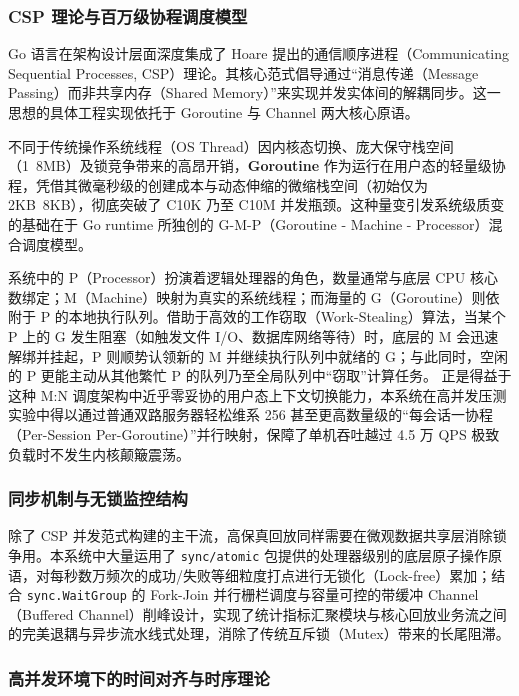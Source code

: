 \subsubsection{CSP 理论与百万级协程调度模型}

Go 语言在架构设计层面深度集成了 Hoare\cite{CSP} 提出的通信顺序进程（Communicating Sequential Processes, CSP）理论。其核心范式倡导通过“消息传递（Message Passing）而非共享内存（Shared Memory）”来实现并发实体间的解耦同步\cite{GoConcurrencyPatterns}。这一思想的具体工程实现依托于 Goroutine 与 Channel 两大核心原语。

不同于传统操作系统线程（OS Thread）因内核态切换、庞大保守栈空间（1~8MB）及锁竞争带来的高昂开销，\textbf{Goroutine} 作为运行在用户态的轻量级协程，凭借其微毫秒级的创建成本与动态伸缩的微缩栈空间（初始仅为 2KB~8KB）\cite{GoSpec}，彻底突破了 C10K 乃至 C10M 并发瓶颈。这种量变引发系统级质变的基础在于 Go runtime 所独创的 G-M-P（Goroutine - Machine - Processor）混合调度模型。

系统中的 P（Processor）扮演着逻辑处理器的角色，数量通常与底层 CPU 核心数绑定；M（Machine）映射为真实的系统线程；而海量的 G（Goroutine）则依附于 P 的本地执行队列。借助于高效的工作窃取（Work-Stealing）算法\cite{GoScheduler, WorkStealing}，当某个 P 上的 G 发生阻塞（如触发文件 I/O、数据库网络等待）时，底层的 M 会迅速解绑并挂起，P 则顺势认领新的 M 并继续执行队列中就绪的 G；与此同时，空闲的 P 更能主动从其他繁忙 P 的队列乃至全局队列中“窃取”计算任务。
正是得益于这种 M:N 调度架构中近乎零妥协的用户态上下文切换能力，本系统在高并发压测实验中得以通过普通双路服务器轻松维系 256 甚至更高数量级的“每会话一协程（Per-Session Per-Goroutine）”并行映射，保障了单机吞吐越过 4.5 万 QPS 极致负载时不发生内核颠簸震荡。

\subsubsection{同步机制与无锁监控结构}

除了 CSP 并发范式构建的主干流，高保真回放同样需要在微观数据共享层消除锁争用。本系统中大量运用了 \texttt{sync/atomic} 包提供的处理器级别的底层原子操作原语，对每秒数万频次的成功/失败等细粒度打点进行无锁化（Lock-free）累加；结合 \texttt{sync.WaitGroup} 的 Fork-Join 并行栅栏调度与容量可控的带缓冲 Channel（Buffered Channel）削峰设计，实现了统计指标汇聚模块与核心回放业务流之间的完美退耦与异步流水线式处理，消除了传统互斥锁（Mutex）带来的长尾阻滞。

\subsubsection{高并发环境下的时间对齐与时序理论}


